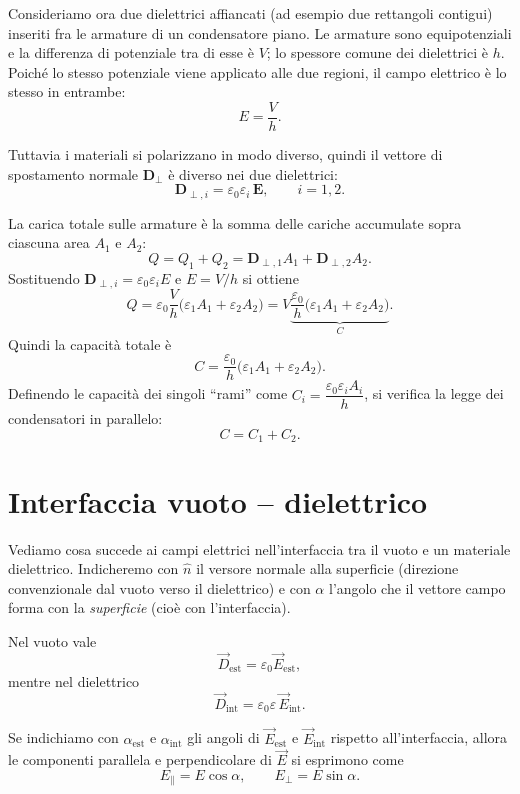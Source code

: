 \documentclass{book}
\begin{document}
Consideriamo ora due dielettrici affiancati (ad esempio due rettangoli contigui) inseriti fra le armature di un condensatore piano. Le armature sono equipotenziali e la differenza di potenziale tra di esse è \(V\); lo spessore comune dei dielettrici è \(h\). Poiché lo stesso potenziale viene applicato alle due regioni, il campo elettrico è lo stesso in entrambe:
\[
E=\frac{V}{h}.
\]

Tuttavia i materiali si polarizzano in modo diverso, quindi il vettore di spostamento normale \(\mathbf{D}_{\perp}\) è diverso nei due dielettrici:
\[
\mathbf{D}_{\perp,i}=\varepsilon_0\varepsilon_i\,\mathbf{E},\qquad i=1,2.
\]

La carica totale sulle armature è la somma delle cariche accumulate sopra ciascuna area \(A_1\) e \(A_2\):
\[
Q=Q_1+Q_2 = \mathbf{D}_{\perp,1}A_1 + \mathbf{D}_{\perp,2}A_2.
\]
Sostituendo \(\mathbf{D}_{\perp,i}=\varepsilon_0\varepsilon_i E\) e \(E=V/h\) si ottiene
\[
Q = \varepsilon_0\frac{V}{h}\bigl(\varepsilon_1 A_1 + \varepsilon_2 A_2\bigr)
= V\underbrace{\frac{\varepsilon_0}{h}\bigl(\varepsilon_1 A_1 + \varepsilon_2 A_2\bigr)}_{C}.
\]
Quindi la capacità totale è
\[
C=\frac{\varepsilon_0}{h}\bigl(\varepsilon_1 A_1 + \varepsilon_2 A_2\bigr).
\]
Definendo le capacità dei singoli “rami” come \(C_i=\dfrac{\varepsilon_0\varepsilon_i A_i}{h}\), si verifica la legge dei condensatori in parallelo:
\[
C = C_1 + C_2.
\]

 
\section{Interfaccia vuoto -- dielettrico}

Vediamo cosa succede ai campi elettrici nell'interfaccia tra il vuoto e un materiale dielettrico.  
Indicheremo con \(\hat{n}\) il versore normale alla superficie (direzione convenzionale dal vuoto verso il dielettrico) e con \(\alpha\) l'angolo che il vettore campo forma con la \emph{superficie} (cioè con l'interfaccia).

Nel vuoto vale
\[
\vec{D}_{\mathrm{est}}=\varepsilon_0\vec{E}_{\mathrm{est}},
\]
mentre nel dielettrico 
\[
\vec{D}_{\mathrm{int}}=\varepsilon_0\varepsilon\,\vec{E}_{\mathrm{int}}.
\]

Se indichiamo con \(\alpha_{\text{est}}\) e \(\alpha_{\text{int}}\) gli angoli di \(\vec{E}_{\text{est}}\) e \(\vec{E}_{\text{int}}\) rispetto all'interfaccia, allora le componenti parallela e perpendicolare di \(\vec{E}\) si esprimono come
\[
E_{\parallel}=E\cos\alpha,\qquad E_{\perp}=E\sin\alpha.
\]
\end{document}
